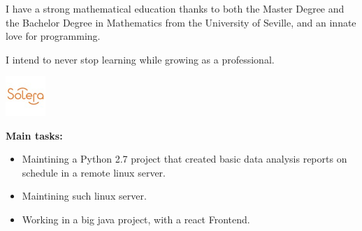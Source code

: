 \documentclass[10pt,a4paper]{altacv}
\begin{document}
\tagline{}

\begin{fullwidth}
\makecvheader
\end{fullwidth}

I have a strong mathematical education thanks to both the Master Degree and the Bachelor Degree in Mathematics from the University of Seville, and an innate love for programming.

I intend to never stop learning while growing as a professional. 
 
\begin{minipage}[t]{0.3\linewidth}
	\centering
  \includegraphics[width=15mm]{soleraInc.jpg}
\end{minipage}
\begin{minipage}[b]{0.69\linewidth}
\end{minipage}

\begin{addmargin}{2em}
\begin{small}
\textbf{Main tasks:}
\begin{itemize}
  \item Maintining a Python 2.7 project that created basic data analysis reports on schedule in a remote linux server.
  \item Maintining such linux server.
  \item Working in a big java project, with a react Frontend.
\end{itemize}
\end{small}
\end{addmargin}
\end{document}
